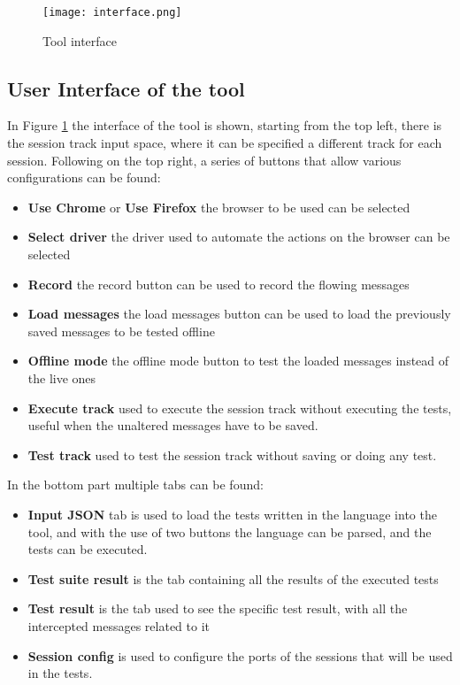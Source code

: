 \begin{figure}
    \texttt{[image: interface.png]}
    \caption{Tool interface}
    \label{fig:plugin_interface}
\end{figure}

\subsection{User Interface of the tool}
In Figure \ref{fig:plugin_interface} the interface of the tool is shown, starting from the top left, there is the session track input space, where it can be specified a different track for each session. Following on the top right, a series of buttons that allow various configurations can be found:
\begin{itemize}
    \item \textbf{Use Chrome} or \textbf{Use Firefox} the browser to be used can be selected
    \item \textbf{Select driver} the driver used to automate the actions on the browser can be selected
    \item \textbf{Record} the record button can be used to record the flowing messages
    \item \textbf{Load messages} the load messages button can be used to load the previously saved messages to be tested offline
    \item \textbf{Offline mode} the offline mode button to test the loaded messages instead of the live ones
    \item \textbf{Execute track} used to execute the session track without executing the tests, useful when the unaltered messages have to be saved.
    \item \textbf{Test track} used to test the session track without saving or doing any test.
\end{itemize}

In the bottom part multiple tabs can be found:
\begin{itemize}
    \item \textbf{Input JSON} tab is used to load the tests written in the language into the tool, and with the use of two buttons the language can be parsed, and the tests can be executed.
    \item \textbf{Test suite result} is the tab containing all the results of the executed tests
    \item \textbf{Test result} is the tab used to see the specific test result, with all the intercepted messages related to it
    \item \textbf{Session config} is used to configure the ports of the sessions that will be used in the tests.
\end{itemize}

